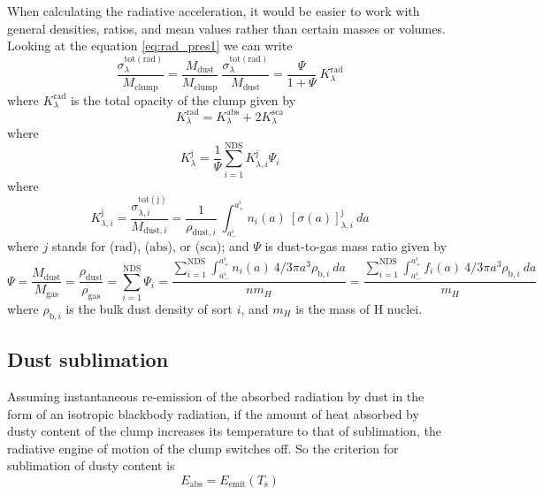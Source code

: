 \documentclass[twocolumn]{aastex62}
\begin{document}
When calculating the radiative acceleration, it would be easier to work with general densities, ratios, and mean values rather than certain masses or volumes. Looking at the equation \ref{eq:rad_pres1} we can write
\begin{equation}
\frac{\sigma_{\lambda}^{\mathrm{tot(rad)}}}{M_{\mathrm{clump}}} =
\frac{M_{\mathrm{dust}}}{M_{\mathrm{clump}}}\
\frac{\sigma_{\lambda}^{\mathrm{tot(rad)}}}{M_{\mathrm{dust}}} =
\frac{\Psi}{1+\Psi}\ K^{\mathrm{rad}}_{\lambda}
\end{equation}
where $K^{\mathrm{rad}}_{\lambda}$ is the total opacity of the clump given by
\begin{equation}\label{eq:K_value1}
K^{\mathrm{rad}}_{\lambda}= K^{\mathrm{abs}}_{\lambda} + 2 K^{\mathrm{sca}}_{\lambda}
\end{equation}
where
\begin{equation}\label{eq:K_value2}
K^{\mathrm{j}}_{\lambda}= \frac{1}{\Psi}
\sum_{i=1}^{\mathrm{NDS}} K^{\mathrm{j}}_{\lambda,i} \Psi_{i}
\end{equation}
where
\begin{equation}\label{eq:K_value3}
K^{\mathrm{j}}_{\lambda, i} =
\frac{\sigma_{\lambda, i}^{\mathrm{tot(j)}}} {M_{\mathrm{dust}, i}} =
\frac{1}{\rho_{\mathrm{dust}, i}}\ 
\int^{a^{i}_{+}}_{a^{i}_{-}}
n_{i}(a)\ [\sigma(a)]_{\lambda, i}^{\mathrm{j}}\ da
\end{equation}
where $j$ stands for ($\mathrm{rad}$), ($\mathrm{abs}$), or ($\mathrm{sca}$); and $\Psi$ is dust-to-gas mass ratio given by
\begin{equation}\label{eq:dust-to-gas}
\Psi = \frac{M_{\mathrm{dust}}}{M_{\mathrm{gas}}} =
\frac{\rho_{\mathrm{dust}}}{\rho_{\mathrm{gas}}} =
\sum_{i=1}^{\mathrm{NDS}} \Psi_{i} =
\frac{\sum_{i=1}^{\mathrm{NDS}} \int^{a^{i}_{+}}_{a^{i}_{-}}
n_{i}(a)\ 4/3 \pi a^3 \rho_{\mathrm{b}, i}\ da}{n m_{H}} =
\frac{\sum_{i=1}^{\mathrm{NDS}} \int^{a^{i}_{+}}_{a^{i}_{-}}
f_{i}(a)\ 4/3 \pi a^3 \rho_{\mathrm{b}, i}\ da}{m_{H}}
\end{equation}
where $\rho_{\mathrm{b}, i}$ is the bulk dust density of sort $i$, and $m_{H}$ is the mass of H nuclei.

\subsection{Dust sublimation}\label{sec:criterion}

Assuming instantaneous re-emission of the absorbed radiation by dust in the form of an isotropic blackbody radiation, if the amount of heat absorbed by dusty content of the clump increases its temperature to that of sublimation, the radiative engine of motion of the clump switches off. So the criterion for sublimation of dusty content is
\begin{equation}\label{eq:criterion}
E_{\mathrm{abs}} = E_{\mathrm{emit}}(T_{\mathrm{s}})
\end{equation}
\end{document}
